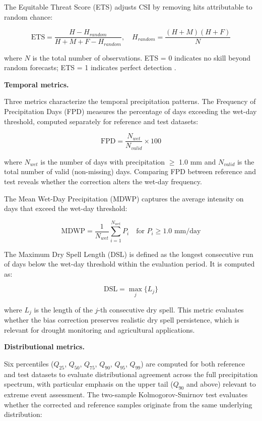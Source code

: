 \documentclass[11pt,a4paper]{article}
\begin{document}
The Equitable Threat Score (ETS) adjusts CSI by removing hits
attributable to random chance:

\begin{equation}\text{ETS} = \frac{H - H_{random}}{H + M + F - H_{random}}, \quad H_{random} = \frac{(H + M)(H + F)}{N}\end{equation}

where \(N\) is the total number of observations. ETS = 0 indicates no
skill beyond random forecasts; ETS = 1 indicates perfect detection
\cite{ref15}.

\textbf{Temporal metrics.}

Three metrics characterize the temporal precipitation patterns. The
Frequency of Precipitation Days (FPD) measures the percentage of days
exceeding the wet-day threshold, computed separately for reference and
test datasets:

\begin{equation}\text{FPD} = \frac{N_{wet}}{N_{valid}} \times 100\end{equation}

where \(N_{wet}\) is the number of days with precipitation \(\geq\) 1.0
mm and \(N_{valid}\) is the total number of valid (non-missing) days.
Comparing FPD between reference and test reveals whether the correction
alters the wet-day frequency.

The Mean Wet-Day Precipitation (MDWP) captures the average intensity on
days that exceed the wet-day threshold:

\begin{equation}\text{MDWP} = \frac{1}{N_{wet}} \sum_{i=1}^{N_{wet}} P_i \quad \text{for } P_i \geq 1.0 \text{ mm/day}\end{equation}

The Maximum Dry Spell Length (DSL) is defined as the longest consecutive
run of days below the wet-day threshold within the evaluation period. It
is computed as:

\begin{equation}\text{DSL} = \max_{j} \{ L_j \}\end{equation}

where \(L_j\) is the length of the \(j\)-th consecutive dry spell. This
metric evaluates whether the bias correction preserves realistic dry
spell persistence, which is relevant for drought monitoring and
agricultural applications.

\textbf{Distributional metrics.}

Six percentiles (\(Q_{25}\), \(Q_{50}\), \(Q_{75}\), \(Q_{90}\),
\(Q_{95}\), \(Q_{99}\)) are computed for both reference and test
datasets to evaluate distributional agreement across the full
precipitation spectrum, with particular emphasis on the upper tail
(\(Q_{90}\) and above) relevant to extreme event assessment. The
two-sample Kolmogorov-Smirnov test evaluates whether the corrected and
reference samples originate from the same underlying distribution:
\end{document}
